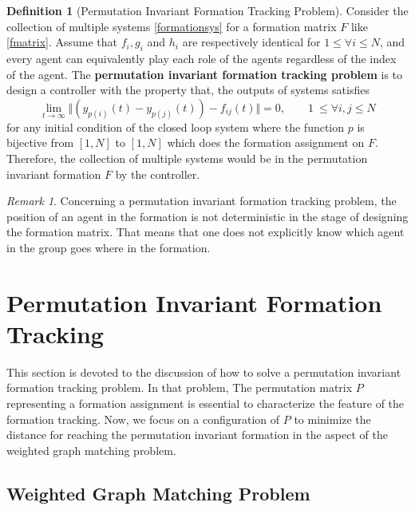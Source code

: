 \documentclass[11pt, a4paper, oneside, openany, reqno]{book}
\theoremstyle{definition}
\newtheorem{definition}[theorem]{Definition}
\theoremstyle{remark}
\newtheorem{remark}[theorem]{Remark}
\numberwithin{equation}{chapter} %
\begin{document}
\begin{definition}[Permutation Invariant Formation Tracking Problem]
	Consider the collection of multiple systems \eqref{formationsys} 
	for a formation matrix $ F $ like \eqref{fmatrix}.
	Assume that $ f_i, g_i $ and $ h_i $ are respectively identical 
	for $ 1 \leq \forall i \leq N $, and 
	every agent can equivalently play each role of the agents
	regardless of the index of the agent.
	The \textbf{permutation invariant formation tracking problem} is 
	to design a controller with the property that,	
	the outputs of systems satisfies
	\begin{equation}
		\lim_{t \to \infty}\Vert \left(y_{p(i)}(t) - y_{p(j)}(t) \right) - f_{ij}(t) \Vert = 0, 
		\qquad 1\ \leq \forall i,j \leq N 	
	\end{equation}
	for any initial condition of the closed loop system
	where the function $ p $ is bijective from $ \left[ 1,N \right] $ to $ \left[ 1,N \right] $
	which does the formation assignment on $ F $.
	Therefore, the collection of multiple systems would be 
	in the permutation invariant formation $ F $ by the controller.
\end{definition}

\begin{remark}
	Concerning a permutation invariant formation tracking problem,
	the position of an agent in the formation is not deterministic in the stage of 
	designing the formation matrix.	
	That means that one does not explicitly know 
	which agent in the group goes where in the formation.
\end{remark}

\section{Permutation Invariant Formation Tracking}\label{permutationinvariantformation}

This section is devoted to the discussion of 
how to solve a permutation invariant formation tracking problem. 
In that problem, The permutation matrix $ P $ representing a formation assignment 
is essential to characterize the feature of the formation tracking.
Now, we focus on a configuration of $ P $ to minimize the distance 
for reaching the permutation invariant formation 
in the aspect of the weighted graph matching problem.

\subsection{Weighted Graph Matching Problem}
\end{document}

